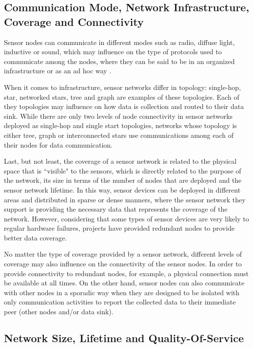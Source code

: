 \subsection{Communication Mode, Network Infrastructure, Coverage and
Connectivity}
\label{sec:sn-infrastructure}

Sensor nodes can communicate in different modes such as radio, diffuse
light, inductive or sound, which may influence on the type of protocols used to
communicate among the nodes, where they can be said to be in an organized
infrastructure or as an ad hoc way \cite{sn-intro01}.

When it comes to infrastructure, sensor networks differ in topology:
single-hop, star, networked stars, tree and graph are examples of these
topologies. Each of they topologies may influence on how data is collection
and routed to their data sink. While there are only two levels of node
connectivity in sensor networks deployed as single-hop and single start
topologies, networks whose topology is either tree, graph or interconnected
stars use communications among each of their nodes for data communication.

Last, but not least, the coverage of a sensor network is related to the
physical space that is ``visible" to the sensors, which is directly related to
the purpose of the network, its size in terms of the number of nodes that are
deployed and the sensor network lifetime. In this way, sensor devices can be
deployed in different areas and distributed in sparse or dense manners, where
the sensor network they support is providing the necessary data that
represents the coverage of the network. However, considering that some types of
sensor devices are very likely to regular hardware failures, projects have
provided redundant nodes \cite{sn-intro01} to provide better data coverage.

No matter the type of coverage provided by a sensor network, different levels
of coverage may also influence on the connectivity of the sensor nodes. In
order to provide connectivity to redundant nodes, for example, a physical 
connection must be available at all times. On the other hand, sensor nodes can
also communicate with other nodes in a sporadic way when they are designed to
be isolated with only communication activities to report the collected data to
their immediate peer (other nodes and/or data sink).

\subsection{Network Size, Lifetime and Quality-Of-Service}

